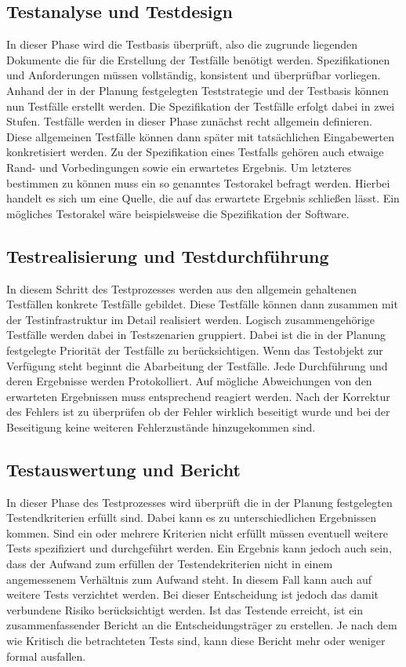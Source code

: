 \subsection{Testanalyse und Testdesign}
\label{subsec:testanalyse_und_design}
In dieser Phase wird die Testbasis überprüft, also die zugrunde liegenden Dokumente die für die Erstellung der Testfälle benötigt werden. Spezifikationen und Anforderungen müssen vollständig, konsistent und überprüfbar vorliegen.
Anhand der in der Planung festgelegten Teststrategie und der Testbasis können nun Testfälle erstellt werden.
Die Spezifikation der Testfälle erfolgt dabei in zwei Stufen. Testfälle werden in dieser Phase zunächst recht allgemein definieren. Diese allgemeinen Testfälle können dann später mit tatsächlichen Eingabewerten konkretisiert werden.
Zu der Spezifikation eines Testfalls gehören auch etwaige Rand- und Vorbedingungen sowie ein erwartetes Ergebnis. Um letzteres bestimmen zu können muss ein so genanntes Testorakel befragt werden. Hierbei handelt es sich um eine Quelle, die auf das erwartete Ergebnis schließen lässt. Ein mögliches Testorakel wäre beispielsweise die Spezifikation der Software.

\subsection{Testrealisierung und Testdurchführung}
\label{subsec:testrealisierung_und_durchführung}
In diesem Schritt des Testprozesses werden aus den allgemein gehaltenen Testfällen konkrete Testfälle gebildet. Diese Testfälle können dann zusammen mit der Testinfrastruktur im Detail realisiert werden. Logisch zusammengehörige Testfälle werden dabei in Testszenarien gruppiert. Dabei ist die in der Planung festgelegte Priorität der Testfälle zu berücksichtigen.
Wenn das Testobjekt zur Verfügung steht beginnt die Abarbeitung der Testfälle. Jede Durchführung und deren Ergebnisse werden Protokolliert. Auf mögliche Abweichungen von den erwarteten Ergebnissen muss entsprechend reagiert werden. Nach der Korrektur des Fehlers ist zu überprüfen ob der Fehler wirklich beseitigt wurde und bei der Beseitigung keine weiteren Fehlerzustände hinzugekommen sind.

\subsection{Testauswertung und Bericht}
\label{subsec:testauswertung_und_bericht}
In dieser Phase des Testprozesses wird überprüft die in der Planung festgelegten Testendkriterien erfüllt sind. Dabei kann es zu unterschiedlichen Ergebnissen kommen.
Sind ein oder mehrere Kriterien nicht erfüllt müssen eventuell weitere Tests spezifiziert und durchgeführt werden. Ein Ergebnis kann jedoch auch sein, dass der Aufwand zum erfüllen der Testendekriterien nicht in einem angemessenem Verhältnis zum Aufwand steht. In diesem Fall kann auch auf weitere Tests verzichtet werden. Bei dieser Entscheidung ist jedoch das damit verbundene Risiko berücksichtigt werden.
Ist das Testende erreicht, ist ein zusammenfassender Bericht an die Entscheidungsträger zu erstellen. Je nach dem wie Kritisch die betrachteten Tests sind, kann diese Bericht mehr oder weniger formal ausfallen.

